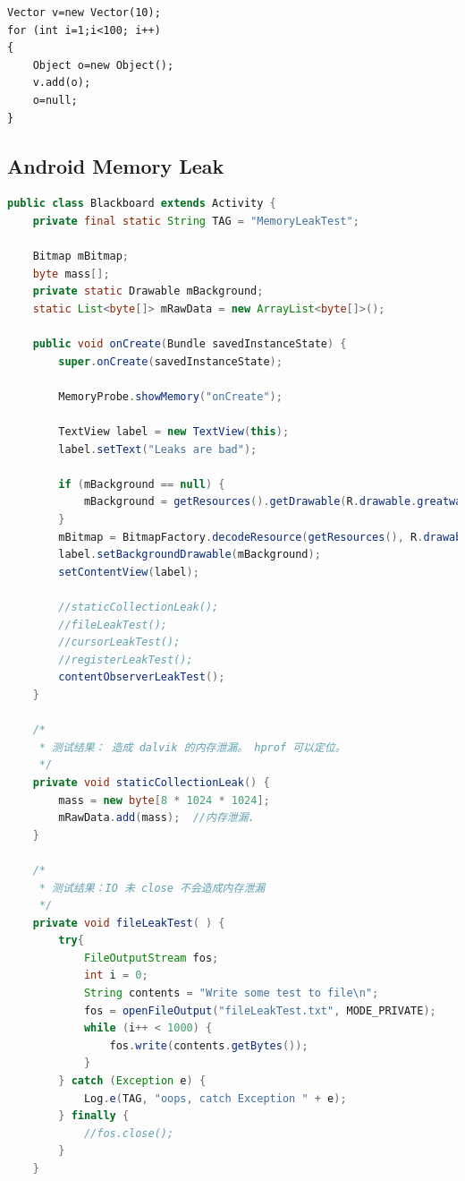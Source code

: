 \documentclass[a4paper, 11pt]{article}
\begin{document}
\begin{lstlisting}
Vector v=new Vector(10);
for (int i=1;i<100; i++)
{
	Object o=new Object();
	v.add(o);
	o=null;	
} 
\end{lstlisting}


\subsection{Android Memory Leak}
\begin{lstlisting}[language=java,]
public class Blackboard extends Activity {
    private final static String TAG = "MemoryLeakTest";

    Bitmap mBitmap;
    byte mass[];
    private static Drawable mBackground;
    static List<byte[]> mRawData = new ArrayList<byte[]>();

    public void onCreate(Bundle savedInstanceState) {
        super.onCreate(savedInstanceState);        

        MemoryProbe.showMemory("onCreate");

        TextView label = new TextView(this);
        label.setText("Leaks are bad");

        if (mBackground == null) {
            mBackground = getResources().getDrawable(R.drawable.greatwall);
        } 
        mBitmap = BitmapFactory.decodeResource(getResources(), R.drawable.greatwall); 
        label.setBackgroundDrawable(mBackground); 
        setContentView(label); 

        //staticCollectionLeak();
        //fileLeakTest();
        //cursorLeakTest();
        //registerLeakTest();
        contentObserverLeakTest();
    }

    /*
     * 测试结果： 造成 dalvik 的内存泄漏。 hprof 可以定位。
     */
    private void staticCollectionLeak() {
        mass = new byte[8 * 1024 * 1024];
        mRawData.add(mass);  //内存泄漏.  
    }

    /*
     * 测试结果：IO 未 close 不会造成内存泄漏 
     */
    private void fileLeakTest( ) {
        try{
            FileOutputStream fos;
            int i = 0;
            String contents = "Write some test to file\n";
            fos = openFileOutput("fileLeakTest.txt", MODE_PRIVATE);
            while (i++ < 1000) {
                fos.write(contents.getBytes());
            }
        } catch (Exception e) {
            Log.e(TAG, "oops, catch Exception " + e);
        } finally {
            //fos.close();
        }
    }


\end{lstlisting}
\end{document}
